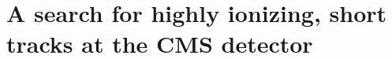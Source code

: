 \documentclass[
twoside=true,
headsepline,     %
headings=normal,
open=right,
numbers=noenddot, %
a4paper,
11pt
]{scrreprt} %
\begin{document}
\chapter{A search for highly ionizing, short tracks at the CMS detector} \label{sec:analysis}



% 


% 





\thispagestyle{empty}
\chapter*{~}
% 
\end{document}
